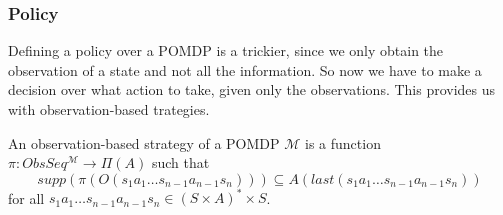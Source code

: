 \subsubsection*{Policy}
Defining a policy over a POMDP is a trickier, since we only obtain the observation of a state and not all the information. So now we have to make a decision over what action to take, given only the observations. This provides us with observation-based trategies. 

\begin{definition}
	An observation-based strategy of a POMDP $\mathcal{M}$ is a function $\pi:ObsSeq^{\mathcal{M}}\to\Pi(A)$ such that 
	\[supp(\pi(O(s_1 a_1 \dots s_{n-1} a_{n-1} s_n)))\subseteq A (last(s_1 a_1 \dots s_{n-1} a_{n-1} s_n))\] for all $s_1 a_1 \dots s_{n-1} a_{n-1} s_n\in(S\times A)^*\times S$.
\end{definition}

